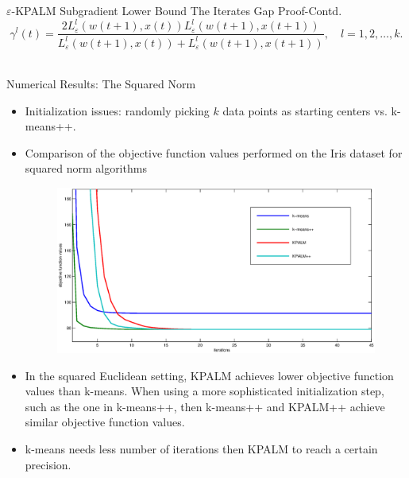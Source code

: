 \documentclass[9pt,handout]{beamer} %
\begin{document}
\begin{frame}{$\varepsilon$-KPALM Subgradient Lower Bound The Iterates Gap Proof-Contd.}
{{\begin{equation*}
			\gamma^l(t) = \frac{2 L^l_{\varepsilon}(w(t+1),x(t)) L^l_{\varepsilon}(w(t+1),x(t+1))}{L^l_{\varepsilon}(w(t+1),x(t)) + L^l_{\varepsilon}(w(t+1),x(t+1))} , \quad l=1,2, \ldots, k.
		\end{equation*}
		}}\\
	\end{frame}
	
	\begin{frame}{Numerical Results: The Squared Norm}
		\begin{itemize}[<+->]
            \item Initialization issues: randomly picking $k$ data points as starting centers vs. k-means++.
        
        	\item Comparison of the objective function values performed on the Iris dataset for squared norm algorithms
		\begin{figure}
    		\centering
        	\includegraphics[width=0.75 \textwidth]{squared_norm_obj_comp}
		\end{figure}

	    	\item In the squared Euclidean setting, KPALM achieves lower objective function values than k-means. When using a more sophisticated initialization step, such as the one in k-means++, then k-means++ and KPALM++ achieve similar objective function values.
			\item k-means needs less number of iterations then KPALM to reach a certain precision.
		\end{itemize}
	\end{frame}	
	
\end{document}
